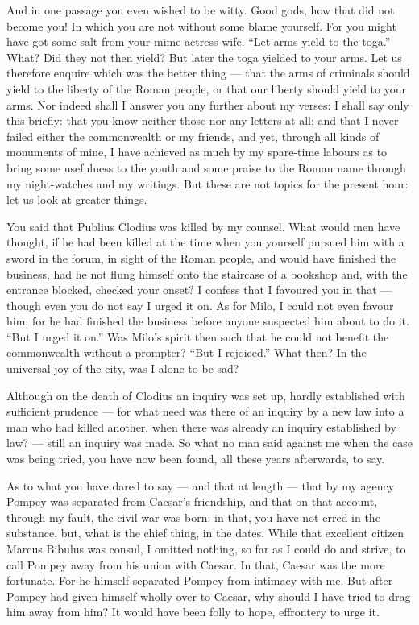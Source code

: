  And in one passage you even wished to be witty. Good gods, how that did not become you! In which you are not without some blame yourself. For you might have got some salt from your mime-actress wife. ``Let arms yield to the toga.'' What? Did they not then yield? But later the toga yielded to your arms. Let us therefore enquire which was the better thing --- that the arms of criminals should yield to the liberty of the Roman people, or that our liberty should yield to your arms. Nor indeed shall I answer you any further about my verses: I shall say only this briefly: that you know neither those nor any letters at all; and that I never failed either the commonwealth or my friends, and yet, through all kinds of monuments of mine, I have achieved as much by my spare-time labours as to bring some usefulness to the youth and some praise to the Roman name through my night-watches and my writings. But these are not topics for the present hour: let us look at greater things.

 You said that Publius Clodius was killed by my counsel. What would men have thought, if he had been killed at the time when you yourself pursued him with a sword in the forum, in sight of the Roman people, and would have finished the business, had he not flung himself onto the staircase of a bookshop and, with the entrance blocked, checked your onset? I confess that I favoured you in that --- though even you do not say I urged it on. As for Milo, I could not even favour him; for he had finished the business before anyone suspected him about to do it. ``But I urged it on.'' Was Milo's spirit then such that he could not benefit the commonwealth without a prompter? ``But I rejoiced.'' What then? In the universal joy of the city, was I alone to be sad?

 Although on the death of Clodius an inquiry was set up, hardly established with sufficient prudence --- for what need was there of an inquiry by a new law into a man who had killed another, when there was already an inquiry established by law? --- still an inquiry was made. So what no man said against me when the case was being tried, you have now been found, all these years afterwards, to say.

 As to what you have dared to say --- and that at length --- that by my agency Pompey was separated from Caesar's friendship, and that on that account, through my fault, the civil war was born: in that, you have not erred in the substance, but, what is the chief thing, in the dates. While that excellent citizen Marcus Bibulus was consul, I omitted nothing, so far as I could do and strive, to call Pompey away from his union with Caesar. In that, Caesar was the more fortunate. For he himself separated Pompey from intimacy with me. But after Pompey had given himself wholly over to Caesar, why should I have tried to drag him away from him? It would have been folly to hope, effrontery to urge it.

